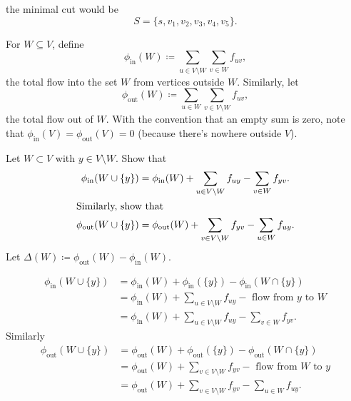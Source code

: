 \documentclass[10pt, a4paper]{article}
\begin{document}
\begin{example}
\begin{solution}
\begin{figure}[H]
        \end{figure}
        the  minimal cut would be
        \[
        S = \{s, v_1, v_2, v_3, v_4, v_5\}.
        \]
    \end{solution}
\end{example}

For $W \subseteq V$,
define
\[
\phi_{\text{in}}(W) \coloneqq \sum_{u \in V \setminus W}\sum_{v \in W}f_{uv},
\]
the total flow into the set $W$ from vertices outside $W$.
Similarly,
let
\[
\phi_{\text{out}}(W) \coloneqq \sum_{u \in W}\sum_{v \in V \setminus W}f_{uv},
\]
the total flow out of $W$.
With the convention that an empty sum is zero,
note that $\phi_{\text{in}}(V) = \phi_{\text{out}}(V) = 0$
(because there's nowhere outside $V$).

\begin{example}
    Let $W \subset V$ with $y \in V \setminus W$.
    Show that
    \begin{align*}
        \phi_{\text{in}}(W \cup \{y\}) &= \phi_{\text{in}}(W) + \sum_{u \in V \setminus W}f_{uy} - \sum_{v \in W}f_{yv}. \\
        \intertext{Similarly,
        show that}
        \phi_{\text{out}}(W \cup \{y\}) &= \phi_{\text{out}}(W) + \sum_{v \in V \setminus W}f_{yv} - \sum_{u \in W}f_{uy}.
    \end{align*}
    Let $\Delta(W) \coloneqq \phi_{\text{out}}(W) - \phi_{\text{in}}(W)$.

    \begin{solution}
        \begin{align*}
            \phi_{\text{in}}(W \cup \{y\}) &= \phi_{\text{in}}(W) + \phi_{\text{in}}(\{y\}) - \phi_{\text{in}}(W \cap \{y\}) \\
            &= \phi_{\text{in}}(W) + \sum_{u \in V \setminus W}f_{uy} - \text{ flow from $y$ to $W$} \\
            &=\phi_{\text{in}}(W) + \sum_{u \in V \setminus W}f_{uy} - \sum_{v \in W}f_{yv}.
        \end{align*}
        Similarly
        \begin{align*}
            \phi_{\text{out}}(W \cup \{y\}) &= \phi_{\text{out}}(W) + \phi_{\text{out}}(\{y\}) - \phi_{\text{out}}(W \cap \{y\}) \\
            &= \phi_{\text{out}}(W) + \sum_{v \in V \setminus W}f_{yv} - \text{ flow from $W$ to $y$} \\
            &=\phi_{\text{out}}(W) + \sum_{v \in V \setminus W}f_{yv} - \sum_{u \in W}f_{uy}.
        \end{align*}
    \end{solution}
\end{example}
\end{document}

